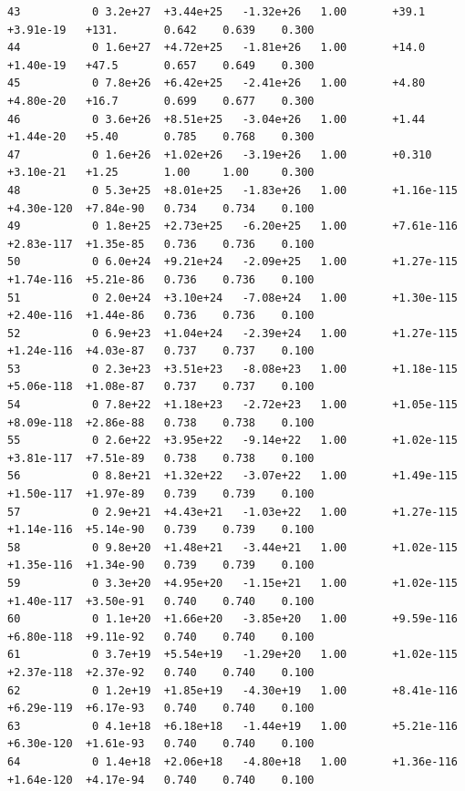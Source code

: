 \documentclass[12pt]{article}
\numberwithin{equation}{section}
\begin{document}
\begin{lstlisting}
43           0 3.2e+27  +3.44e+25   -1.32e+26   1.00       +39.1       +3.91e-19   +131.       0.642    0.639    0.300
44           0 1.6e+27  +4.72e+25   -1.81e+26   1.00       +14.0       +1.40e-19   +47.5       0.657    0.649    0.300
45           0 7.8e+26  +6.42e+25   -2.41e+26   1.00       +4.80       +4.80e-20   +16.7       0.699    0.677    0.300
46           0 3.6e+26  +8.51e+25   -3.04e+26   1.00       +1.44       +1.44e-20   +5.40       0.785    0.768    0.300
47           0 1.6e+26  +1.02e+26   -3.19e+26   1.00       +0.310      +3.10e-21   +1.25       1.00     1.00     0.300
48           0 5.3e+25  +8.01e+25   -1.83e+26   1.00       +1.16e-115  +4.30e-120  +7.84e-90   0.734    0.734    0.100
49           0 1.8e+25  +2.73e+25   -6.20e+25   1.00       +7.61e-116  +2.83e-117  +1.35e-85   0.736    0.736    0.100
50           0 6.0e+24  +9.21e+24   -2.09e+25   1.00       +1.27e-115  +1.74e-116  +5.21e-86   0.736    0.736    0.100
51           0 2.0e+24  +3.10e+24   -7.08e+24   1.00       +1.30e-115  +2.40e-116  +1.44e-86   0.736    0.736    0.100
52           0 6.9e+23  +1.04e+24   -2.39e+24   1.00       +1.27e-115  +1.24e-116  +4.03e-87   0.737    0.737    0.100
53           0 2.3e+23  +3.51e+23   -8.08e+23   1.00       +1.18e-115  +5.06e-118  +1.08e-87   0.737    0.737    0.100
54           0 7.8e+22  +1.18e+23   -2.72e+23   1.00       +1.05e-115  +8.09e-118  +2.86e-88   0.738    0.738    0.100
55           0 2.6e+22  +3.95e+22   -9.14e+22   1.00       +1.02e-115  +3.81e-117  +7.51e-89   0.738    0.738    0.100
56           0 8.8e+21  +1.32e+22   -3.07e+22   1.00       +1.49e-115  +1.50e-117  +1.97e-89   0.739    0.739    0.100
57           0 2.9e+21  +4.43e+21   -1.03e+22   1.00       +1.27e-115  +1.14e-116  +5.14e-90   0.739    0.739    0.100
58           0 9.8e+20  +1.48e+21   -3.44e+21   1.00       +1.02e-115  +1.35e-116  +1.34e-90   0.739    0.739    0.100
59           0 3.3e+20  +4.95e+20   -1.15e+21   1.00       +1.02e-115  +1.40e-117  +3.50e-91   0.740    0.740    0.100
60           0 1.1e+20  +1.66e+20   -3.85e+20   1.00       +9.59e-116  +6.80e-118  +9.11e-92   0.740    0.740    0.100
61           0 3.7e+19  +5.54e+19   -1.29e+20   1.00       +1.02e-115  +2.37e-118  +2.37e-92   0.740    0.740    0.100
62           0 1.2e+19  +1.85e+19   -4.30e+19   1.00       +8.41e-116  +6.29e-119  +6.17e-93   0.740    0.740    0.100
63           0 4.1e+18  +6.18e+18   -1.44e+19   1.00       +5.21e-116  +6.30e-120  +1.61e-93   0.740    0.740    0.100
64           0 1.4e+18  +2.06e+18   -4.80e+18   1.00       +1.36e-116  +1.64e-120  +4.17e-94   0.740    0.740    0.100

\end{lstlisting}
\end{document}
